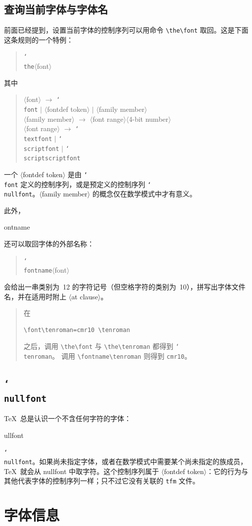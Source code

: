 \documentclass[a4paper]{rapport3}
\makeatletter
\def\nl{\protect\\}\def\n#1{{\tt #1}}\def\cs#1{{\tt\char`\\#1}}\let\csc\cs
\def\gr#1{$\langle$#1$\rangle$}\def\key#1{{\tt#1}}
\newenvironment{disp}{\begin{quotation}}{\end{quotation}}
\newenvironment{Disp}{\begin{quotation}}{\end{quotation}}
\newenvironment{example}{\begin{quotation}}{\end{quotation}}
\def\cstoidx#1\par{\index{#1@\cs{#1}}}
\def\csidx#1{\cstoidx #1\par\cs{#1}}
\makeatother
\begin{document}
\subsection{查询当前字体与字体名}

前面已经提到，设置当前字体的控制序列可以用命令 \verb>\the\font> 取回。这是下面这条规则的一个特例：
\begin{Disp}\cs{the}\gr{font}\end{Disp} 其中
\begin{disp}\gr{font} $\longrightarrow$
\cs{font} $|$ \gr{fontdef token} $|$ \gr{family member}\nl
\gr{family member} $\longrightarrow$
\gr{font range}\gr{4-bit number}\nl
\gr{font range} $\longrightarrow$
\cs{textfont} $|$ \cs{scriptfont} $|$ \cs{scriptscriptfont}\end{disp}
\awp
一个 \gr{fontdef token} 是由 \cs{font} 定义的控制序列，或是预定义的控制序列 \cs{nullfont}。\gr{family member} 的概念仅在数学模式中才有意义。

此外，
\cstoidx fontname\par
还可以取回字体的外部名称：
\begin{Disp}\cs{fontname}\gr{font}\end{Disp}
会给出一串类别为~12 的字符记号（但空格字符的类别为~10），拼写出字体文件名，并在适用时附上 \gr{at clause}。

\begin{example} 在
\begin{verbatim}
\font\tenroman=cmr10 \tenroman
\end{verbatim}
之后，调用 \verb>\the\font> 与 \verb>\the\tenroman> 都得到 \cs{tenroman}。
调用 \verb>\fontname\tenroman> 则得到 \n{cmr10}。
\end{example}

\subsection{\cs{nullfont}}

\TeX\ 总是认识一个不含任何字符的字体：\csidx{nullfont}。如果尚未指定字体，或者在数学模式中需要某个尚未指定的族成员，\TeX\ 就会从 nullfont 中取字符。这个控制序列属于 \gr{fontdef token}：它的行为与其他代表字体的控制序列一样；只不过它没有关联的 \n{tfm} 文件。

\section{字体信息}
\end{document}
